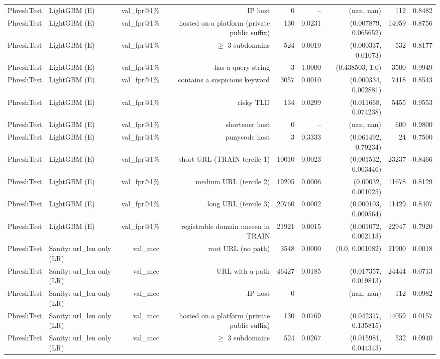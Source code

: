 \begin{table}[t]
\begin{tabular}{llrrrrrrr}
PhreshTest & LightGBM (E) & val\_fpr@1\% & IP host & 0 & -- & (nan, nan) & 112 & 0.8482 \\
PhreshTest & LightGBM (E) & val\_fpr@1\% & hosted on a platform (private public suffix) & 130 & 0.0231 & (0.007879, 0.065652) & 14059 & 0.8756 \\
PhreshTest & LightGBM (E) & val\_fpr@1\% & $\geq$ 3 subdomains & 524 & 0.0019 & (0.000337, 0.01073) & 532 & 0.8177 \\
PhreshTest & LightGBM (E) & val\_fpr@1\% & has a query string & 3 & 1.0000 & (0.438503, 1.0) & 3500 & 0.9949 \\
PhreshTest & LightGBM (E) & val\_fpr@1\% & contains a suspicious keyword & 3057 & 0.0010 & (0.000334, 0.002881) & 7418 & 0.8543 \\
PhreshTest & LightGBM (E) & val\_fpr@1\% & risky TLD & 134 & 0.0299 & (0.011668, 0.074238) & 5455 & 0.9553 \\
PhreshTest & LightGBM (E) & val\_fpr@1\% & shortener host & 0 & -- & (nan, nan) & 600 & 0.9800 \\
PhreshTest & LightGBM (E) & val\_fpr@1\% & punycode host & 3 & 0.3333 & (0.061492, 0.79234) & 24 & 0.7500 \\
PhreshTest & LightGBM (E) & val\_fpr@1\% & short URL (TRAIN tercile 1) & 10010 & 0.0023 & (0.001532, 0.003446) & 23237 & 0.8466 \\
PhreshTest & LightGBM (E) & val\_fpr@1\% & medium URL (tercile 2) & 19205 & 0.0006 & (0.00032, 0.001025) & 11678 & 0.8129 \\
PhreshTest & LightGBM (E) & val\_fpr@1\% & long URL (tercile 3) & 20760 & 0.0002 & (0.000103, 0.000564) & 11429 & 0.8407 \\
PhreshTest & LightGBM (E) & val\_fpr@1\% & registrable domain unseen in TRAIN & 21921 & 0.0015 & (0.001072, 0.002113) & 22947 & 0.7920 \\
PhreshTest & Sanity: url\_len only (LR) & val\_mcc & root URL (no path) & 3548 & 0.0000 & (0.0, 0.001082) & 21900 & 0.0018 \\
PhreshTest & Sanity: url\_len only (LR) & val\_mcc & URL with a path & 46427 & 0.0185 & (0.017357, 0.019813) & 24444 & 0.0713 \\
PhreshTest & Sanity: url\_len only (LR) & val\_mcc & IP host & 0 & -- & (nan, nan) & 112 & 0.0982 \\
PhreshTest & Sanity: url\_len only (LR) & val\_mcc & hosted on a platform (private public suffix) & 130 & 0.0769 & (0.042317, 0.135815) & 14059 & 0.0157 \\
PhreshTest & Sanity: url\_len only (LR) & val\_mcc & $\geq$ 3 subdomains & 524 & 0.0267 & (0.015981, 0.044343) & 532 & 0.0940 \\

\end{tabular}
\end{table}
